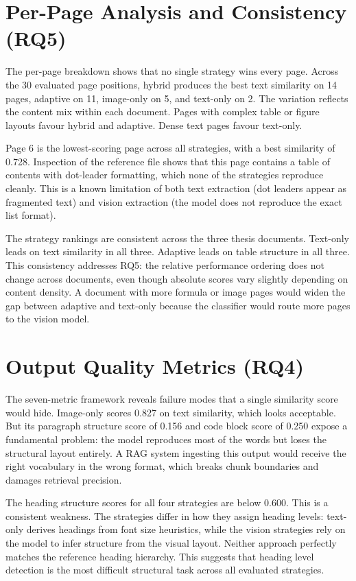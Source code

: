 \section{Per-Page Analysis and Consistency (RQ5)}

The per-page breakdown shows that no single strategy wins every page.
Across the 30 evaluated page positions, hybrid produces the best text
similarity on 14 pages, adaptive on 11, image-only on 5, and text-only
on 2. The variation reflects the content mix within each document.
Pages with complex table or figure layouts favour hybrid and adaptive.
Dense text pages favour text-only.

Page 6 is the lowest-scoring page across all strategies, with a best
similarity of 0.728. Inspection of the reference file shows that this
page contains a table of contents with dot-leader formatting, which none
of the strategies reproduce cleanly. This is a known limitation of both
text extraction (dot leaders appear as fragmented text) and vision
extraction (the model does not reproduce the exact list format).

The strategy rankings are consistent across the three thesis documents.
Text-only leads on text similarity in all three. Adaptive leads on table
structure in all three. This consistency addresses RQ5: the relative
performance ordering does not change across documents, even though absolute
scores vary slightly depending on content density. A document with more
formula or image pages would widen the gap between adaptive and text-only
because the classifier would route more pages to the vision model.

\section{Output Quality Metrics (RQ4)}

The seven-metric framework reveals failure modes that a single similarity
score would hide. Image-only scores 0.827 on text similarity, which looks
acceptable. But its paragraph structure score of 0.156 and code block score
of 0.250 expose a fundamental problem: the model reproduces most of the
words but loses the structural layout entirely. A RAG system ingesting this
output would receive the right vocabulary in the wrong format, which breaks
chunk boundaries and damages retrieval precision.

The heading structure scores for all four strategies are below 0.600. This
is a consistent weakness. The strategies differ in how they assign heading
levels: text-only derives headings from font size heuristics, while the
vision strategies rely on the model to infer structure from the visual
layout. Neither approach perfectly matches the reference heading hierarchy.
This suggests that heading level detection is the most difficult structural
task across all evaluated strategies.

